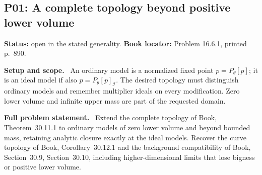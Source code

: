 \documentclass[11pt]{article}
\newcommand{\field}[1]{\par\medskip\noindent\textbf{#1.}\ }
\begin{document}
\subsection{P01: A complete topology beyond positive lower volume}
\label{P01}
\noindent\textbf{Status:} open in the stated generality. \textbf{Book locator:} Problem 16.6.1, printed p.~890.
\field{Setup and scope} An ordinary model is a normalized fixed point $p=P_\theta[p]$; it is an ideal model if also $p=P_\theta[p]_{\mathcal I}$. The desired topology must distinguish ordinary models and remember multiplier ideals on every modification. Zero lower volume and infinite upper mass are part of the requested domain.
\field{Full problem statement} Extend the complete topology of Book, Theorem~30.11.1 to ordinary models of zero lower volume and beyond bounded mass, retaining analytic closure exactly at the ideal models. Recover the curve topology of Book, Corollary~30.12.1 and the background compatibility of Book, Section~30.9, Section~30.10, including higher-dimensional limits that lose bigness or positive lower volume.
\end{document}
